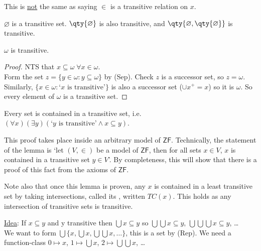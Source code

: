 \begin{warning}
    This is \underline{not} the same as saying $\in$ is a transitive relation on $x$.
\end{warning}

\begin{example}
    $\varnothing$ is a transitive set.
    $\qty{\varnothing}$ is also transitive, and $\qty{\varnothing, \qty{\varnothing}}$ is transitive.
\end{example}

\begin{example}
    $\omega$ is transitive.
\end{example}

\begin{proof}
    NTS that $x \subseteq \omega \; \forall x \in \omega$. \\
    Form the set $z = \{y \in \omega : y \subseteq \omega\}$ by (Sep).
    Check $z$ is a successor set, so $z = \omega$.
    Similarly, $\{x \in \omega : \text{`$x$ is transitive'}\}$ is also a successor set ($\cup x^+ = x$) so it is $\omega$.
    So every element of $\omega$ is a transitive set.
\end{proof}

\begin{lemma}
    Every set is contained in a transitive set, i.e. $(\forall x)(\exists y)(\text{`$y$ is transitive'} \wedge x \subseteq y)$.
\end{lemma}

\begin{remark}
    This proof takes place inside an arbitrary model of $\mathsf{ZF}$.
    Technically, the statement of the lemma is `let $(V, \in)$ be a model of $\mathsf{ZF}$, then for all sets $x \in V$, $x$ is contained in a transitive set $y \in V$'.
    By completeness, this will show that there is a proof of this fact from the axioms of $\mathsf{ZF}$.

    Note also that once this lemma is proven, any $x$ is contained in a least transitive set by taking intersections, called its , written $TC(x)$.
    This holds as any intersection of transitive sets is transitive.
\end{remark}

\underline{Idea}: If $x \subseteq y$ and y transitive then $\bigcup x \subseteq y$ so $\bigcup \bigcup x \subseteq y$, $\bigcup \bigcup \bigcup x \subseteq y$, \dots \\
We want to form $\bigcup \{x, \bigcup x, \bigcup \bigcup x, \dots\}$, this is a set by (Rep).
We need a function-class $0 \mapsto x$, $1 \mapsto \bigcup x$, $2 \mapsto \bigcup \bigcup x$, \dots

